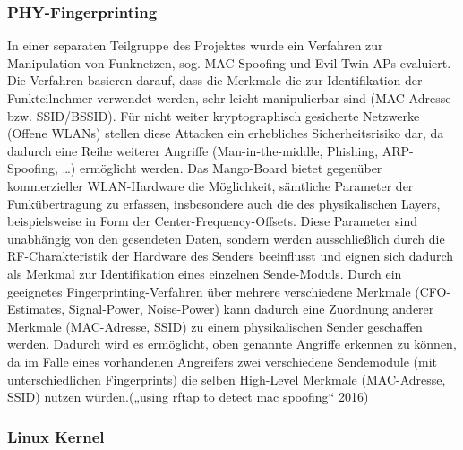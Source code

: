 \documentclass[letterpaper,11pt]{article}
\begin{document}
\begin{onehalfspace}
\subsubsection{PHY-Fingerprinting}\label{phy-fingerprinting}

In einer separaten Teilgruppe des Projektes wurde ein Verfahren zur
Manipulation von Funknetzen, sog. MAC-Spoofing und Evil-Twin-APs
evaluiert. Die Verfahren basieren darauf, dass die Merkmale die zur
Identifikation der Funkteilnehmer verwendet werden, sehr leicht
manipulierbar sind (MAC-Adresse bzw. SSID/BSSID). Für nicht weiter
kryptographisch gesicherte Netzwerke (Offene WLANs) stellen diese
Attacken ein erhebliches Sicherheitsrisiko dar, da dadurch eine Reihe
weiterer Angriffe (Man-in-the-middle, Phishing, ARP-Spoofing, \ldots{})
ermöglicht werden.
Das Mango-Board bietet gegenüber kommerzieller WLAN-Hardware die
Möglichkeit, sämtliche Parameter der Funkübertragung zu erfassen,
insbesondere auch die des physikalischen Layers, beispielsweise in Form
der Center-Frequency-Offsets. Diese Parameter sind unabhängig von den
gesendeten Daten, sondern werden ausschließlich durch die
RF-Charakteristik der Hardware des Senders beeinflusst und eignen sich
dadurch als Merkmal zur Identifikation eines einzelnen Sende-Moduls.
Durch ein geeignetes Fingerprinting-Verfahren über mehrere verschiedene
Merkmale (CFO-Estimates, Signal-Power, Noise-Power) kann dadurch eine
Zuordnung anderer Merkmale (MAC-Adresse, SSID) zu einem physikalischen
Sender geschaffen werden. Dadurch wird es ermöglicht, oben genannte
Angriffe erkennen zu können, da im Falle eines vorhandenen Angreifers
zwei verschiedene Sendemodule (mit unterschiedlichen Fingerprints) die
selben High-Level Merkmale (MAC-Adresse, SSID) nutzen würden.(„using
rftap to detect mac spoofing`` 2016)

\subsubsection{Linux Kernel}\label{linux-kernel}


\end{onehalfspace}
\end{document}
